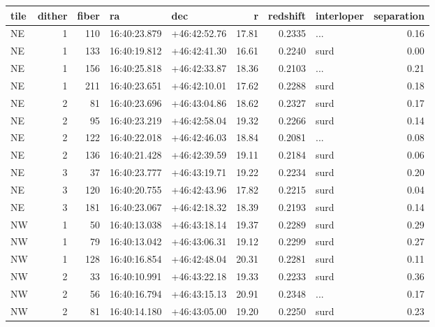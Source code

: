 \begin{tabular}{lrrllrrlr}
\toprule
tile &  dither &  fiber &            ra &           dec &      r &  redshift & interloper &  separation \\
\midrule
  NE &       1 &    110 &  16:40:23.879 &  +46:42:52.76 &  17.81 &    0.2335 &        ... &        0.16 \\
  NE &       1 &    133 &  16:40:19.812 &  +46:42:41.30 &  16.61 &    0.2240 &       surd &        0.00 \\
  NE &       1 &    156 &  16:40:25.818 &  +46:42:33.87 &  18.36 &    0.2103 &        ... &        0.21 \\
  NE &       1 &    211 &  16:40:23.651 &  +46:42:10.01 &  17.62 &    0.2288 &       surd &        0.18 \\
  NE &       2 &     81 &  16:40:23.696 &  +46:43:04.86 &  18.62 &    0.2327 &       surd &        0.17 \\
  NE &       2 &     95 &  16:40:23.219 &  +46:42:58.04 &  19.32 &    0.2266 &       surd &        0.14 \\
  NE &       2 &    122 &  16:40:22.018 &  +46:42:46.03 &  18.84 &    0.2081 &        ... &        0.08 \\
  NE &       2 &    136 &  16:40:21.428 &  +46:42:39.59 &  19.11 &    0.2184 &       surd &        0.06 \\
  NE &       3 &     37 &  16:40:23.777 &  +46:43:19.71 &  19.22 &    0.2234 &       surd &        0.20 \\
  NE &       3 &    120 &  16:40:20.755 &  +46:42:43.96 &  17.82 &    0.2215 &       surd &        0.04 \\
  NE &       3 &    181 &  16:40:23.067 &  +46:42:18.32 &  18.39 &    0.2193 &       surd &        0.14 \\
  NW &       1 &     50 &  16:40:13.038 &  +46:43:18.14 &  19.37 &    0.2289 &       surd &        0.29 \\
  NW &       1 &     79 &  16:40:13.042 &  +46:43:06.31 &  19.12 &    0.2299 &       surd &        0.27 \\
  NW &       1 &    128 &  16:40:16.854 &  +46:42:48.04 &  20.31 &    0.2281 &       surd &        0.11 \\
  NW &       2 &     33 &  16:40:10.991 &  +46:43:22.18 &  19.33 &    0.2233 &       surd &        0.36 \\
  NW &       2 &     56 &  16:40:16.794 &  +46:43:15.13 &  20.91 &    0.2348 &        ... &        0.17 \\
  NW &       2 &     81 &  16:40:14.180 &  +46:43:05.00 &  19.20 &    0.2250 &       surd &        0.23 \\

\end{tabular}
